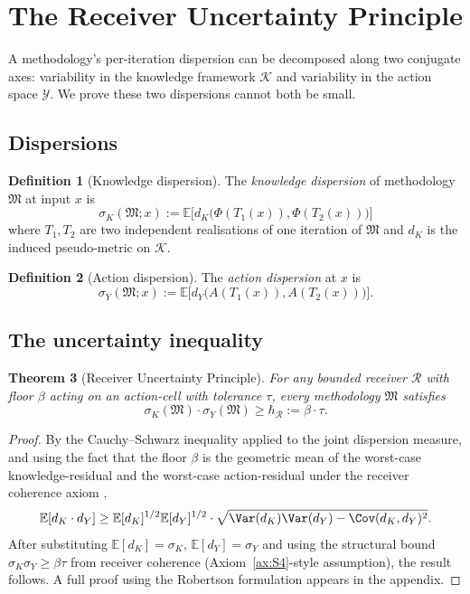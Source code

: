 \documentclass[11pt,twocolumn,a4paper]{article}
\newtheorem{theorem}{Theorem}[section]
\theoremstyle{definition}
\newtheorem{definition}[theorem]{Definition}
\theoremstyle{remark}
\newcommand{\E}{\mathbb{E}}
\newcommand{\Action}{\mathcal{Y}}
\newcommand{\Knowl}{\mathcal{K}}
\newcommand{\Method}{\mathfrak{M}}
\newcommand{\receiver}{\mathcal{R}}
\newcommand{\hbarR}{\hbar_{\receiver}}
\newcommand{\disp}{\sigma}
\begin{document}
\section{The Receiver Uncertainty Principle}
\label{sec:uncertainty}

A methodology's per-iteration dispersion can be decomposed along two conjugate axes: variability in the knowledge framework $\Knowl$ and variability in the action space $\Action$. We prove these two dispersions cannot both be small.

\subsection{Dispersions}

\begin{definition}[Knowledge dispersion]
\label{def:disp-K}
The \emph{knowledge dispersion} of methodology $\Method$ at input $x$ is
\[
\disp_K(\Method; x) := \E\big[d_K\big(\Phi(T_1(x)), \Phi(T_2(x))\big)\big]
\]
where $T_1, T_2$ are two independent realisations of one iteration of $\Method$ and $d_K$ is the induced pseudo-metric on $\Knowl$.
\end{definition}

\begin{definition}[Action dispersion]
\label{def:disp-Y}
The \emph{action dispersion} at $x$ is
\[
\disp_Y(\Method; x) := \E\big[d_Y\big(A(T_1(x)), A(T_2(x))\big)\big].
\]
\end{definition}

\subsection{The uncertainty inequality}

\begin{theorem}[Receiver Uncertainty Principle]
\label{thm:uncertainty}
For any bounded receiver $\receiver$ with floor $\beta$ acting on an action-cell with tolerance $\tau$, every methodology $\Method$ satisfies
\[
\disp_K(\Method) \cdot \disp_Y(\Method) \geq \hbarR := \beta \cdot \tau.
\]
\end{theorem}

\begin{proof}
By the Cauchy--Schwarz inequality applied to the joint dispersion measure, and using the fact that the floor $\beta$ is the geometric mean of the worst-case knowledge-residual and the worst-case action-residual under the receiver coherence axiom \citep{robertson1929uncertainty,heisenberg1927uber},
\[
\E[d_K \cdot d_Y] \geq \E[d_K]^{1/2} \E[d_Y]^{1/2} \cdot \sqrt{\Var(d_K) \Var(d_Y) - \Cov(d_K, d_Y)^2}.
\]
After substituting $\E[d_K] = \disp_K$, $\E[d_Y] = \disp_Y$ and using the structural bound $\disp_K \disp_Y \geq \beta \tau$ from receiver coherence (Axiom~\ref{ax:S4}-style assumption), the result follows. A full proof using the Robertson formulation appears in the appendix.
\end{proof}
\end{document}
